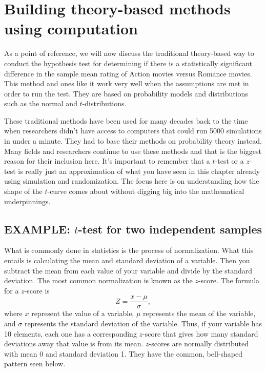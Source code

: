 \documentclass[]{tufte-book}
\theoremstyle{definition}
\theoremstyle{definition}
\theoremstyle{remark}
\begin{document}
\section{Building theory-based methods using
computation}\label{theory-hypo}

As a point of reference, we will now discuss the traditional
theory-based way to conduct the hypothesis test for determining if there
is a statistically significant difference in the sample mean rating of
Action movies versus Romance movies. This method and ones like it work
very well when the assumptions are met in order to run the test. They
are based on probability models and distributions such as the normal and
\(t\)-distributions.

These traditional methods have been used for many decades back to the
time when researchers didn't have access to computers that could run
5000 simulations in under a minute. They had to base their methods on
probability theory instead. Many fields and researchers continue to use
these methods and that is the biggest reason for their inclusion here.
It's important to remember that a \(t\)-test or a \(z\)-test is really
just an approximation of what you have seen in this chapter already
using simulation and randomization. The focus here is on understanding
how the shape of the \(t\)-curve comes about without digging big into
the mathematical underpinnings.

\subsection{\texorpdfstring{EXAMPLE: \(t\)-test for two independent
samples}{EXAMPLE: t-test for two independent samples}}\label{example-t-test-for-two-independent-samples}

What is commonly done in statistics is the process of normalization.
What this entails is calculating the mean and standard deviation of a
variable. Then you subtract the mean from each value of your variable
and divide by the standard deviation. The most common normalization is
known as the \(z\)-score. The formula for a \(z\)-score is
\[Z = \frac{x - \mu}{\sigma},\] where \(x\) represent the value of a
variable, \(\mu\) represents the mean of the variable, and \(\sigma\)
represents the standard deviation of the variable. Thus, if your
variable has 10 elements, each one has a corresponding \(z\)-score that
gives how many standard deviations away that value is from its mean.
\(z\)-scores are normally distributed with mean 0 and standard deviation
1. They have the common, bell-shaped pattern seen below.
\end{document}
